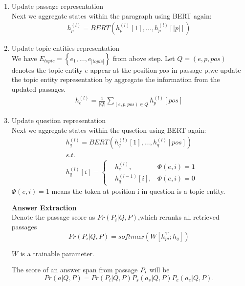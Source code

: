 \documentclass[sigconf]{acmart}
\begin{document}
\begin{enumerate}[(1)]
		\item Update passage representation\\
		Next we aggregate states within the paragraph using BERT again:
		\begin{displaymath}
			\begin{aligned}
				h_{p}^{(l)} = BERT(h_p^{(l)}[1],...,h_p^{(l)}[|p|])
			\end{aligned}
		\end{displaymath}
		
		\item Update topic entities representation\\
		We have $E_{topic}=\left\{e_1,...,e_{|topic|}\right\}$ from above step. 
		Let $Q = \left(e,p,pos\right)$ denotes the topic entity $e$ appear at the position $pos$ in passage p,we update the topic entity representation by aggregate the information from the updated passages.
		\begin{displaymath}
			\begin{aligned}
				h^{(l)}_{e} = \frac{1}{|Q|}\sum\limits_{(e,p,pos) \in Q} h_p^{(l)}[pos]
			\end{aligned}
		\end{displaymath}
		
		\item Update question representation\\
		Next we aggregate states within the qusetion using BERT again:
		\begin{displaymath}
			\begin{aligned}
				&h_{q}^{(l)} = BERT(h_q^{(l)}[1],...,h_q^{(l)}[pos])\\
				&s.t.\\
				&h_q^{(l)}[i] = \left\{
				\begin{aligned}
					&h^{(l)}_{e}  		 , & {\Phi(e,i) = 1} \\
					&h_q^{(l-1)}[i]     ,& { \Phi(e,i) = 0 }
				\end{aligned}
				\right.
			\end{aligned}
		\end{displaymath}
		$\Phi(e,i)=1$ means the token at position i in question  is a topic entity.
		
		
		
		\textbf{ Answer Extraction }\\		
		Denote the passage score as $Pr(P_i|Q, P)$,which reranks all retrieved passages
		\begin{displaymath}
			Pr(P_i|Q, P) = softmax( W[h_{pi}^\mathrm{ T };h_q] )
		\end{displaymath}
		
		$W$ is a trainable parameter.
		
		The score of an answer span from passage $\MakeUppercase{p}_i$ will be
		\begin{displaymath}
			Pr(a| Q, P) = 	Pr(P_i|Q, P)P_s(a_s|Q, P)P_e(a_e|Q, P).
		\end{displaymath}
		
	\end{enumerate} 
\end{document}
